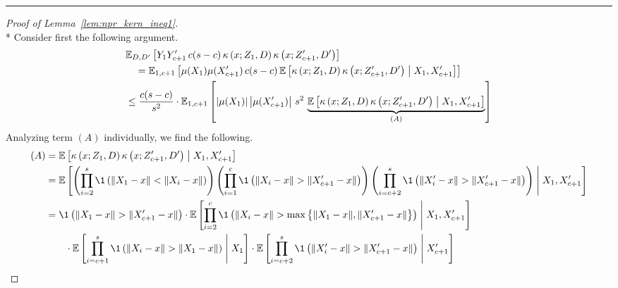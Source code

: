 \hrule

\begin{proof}[Proof of Lemma~\ref{lem:npr_kern_ineq1}]\mbox{}\\*
	Consider first the following argument.
	\begin{equation}
		\begin{aligned}
			 & \mathbb{E}_{D, D^{\prime}}\left[Y_{1}Y_{c+1}^{\prime} \, c(s-c) \, \kappa\left(x; Z_{1}, D\right)\kappa\left(x; Z_{c+1}^{\prime}, D^{\prime}\right)\right]          \\
			 & \quad = \mathbb{E}_{1, c+1}\left[\mu(X_1) \mu(X_{c+1}^{\prime}) \, c(s-c) \,
			\mathbb{E}\left[\kappa\left(x; Z_{1}, D\right)\kappa\left(x; Z_{c+1}^{\prime}, D^{\prime}\right) \; \middle| \; X_1, X_{c+1}^{\prime}\right]\right]                    \\
			 & \leq \frac{c(s-c)}{s^2} \cdot \mathbb{E}_{1, c+1}\left[\left|\mu(X_1)\right| \left|\mu(X_{c+1}^{\prime})\right| \, s^2 \,
			\underbrace{\mathbb{E}\left[\kappa\left(x; Z_{1}, D\right)\kappa\left(x; Z_{c+1}^{\prime}, D^{\prime}\right) \; \middle| \; X_1, X_{c+1}^{\prime}\right]}_{(A)}\right] \\
		\end{aligned}
	\end{equation}
	Analyzing term $(A)$ individually, we find the following.
	\begin{equation}
		\begin{aligned}
			(A)
			 & = \E\left[\kappa\left(x; Z_{1}, D\right)\kappa\left(x; Z_{c+1}^{\prime}, D^{\prime}\right) \; \middle| \; X_1, X_{c+1}^{\prime}\right]                                                                                       \\
			 & = \E\left[\left(\prod_{i = 2}^{s}\1\left(\|X_1 - x\| < \|X_{i} - x\|\right)\right)
				\left(\prod_{i = 1}^{c}\1\left(\|X_i - x\| > \|X_{c+1}^{\prime} - x\|\right)\right)
			\left(\prod_{i = c+2}^{s}\1\left(\|X_i^{\prime} - x\| > \|X_{c+1}^{\prime} - x\|\right)\right) \; \middle| \; X_1, X_{c+1}^{\prime}\right]                                                                                      \\
			 & = \1\left(\|X_1 - x\| > \|X_{c+1}^{\prime} - x\|\right) \cdot \E\left[\prod_{i = 2}^{c}\1\left(\|X_{i} - x\| > \max\left\{\|X_{1} - x\|, \|X_{c+1}^{\prime} - x\|\right\}\right) \; \middle| \; X_1, X_{c+1}^{\prime}\right] \\
			 & \quad \quad  \cdot \E\left[\prod_{i = c+1}^{s}\1\left(\|X_i - x\| > \|X_{1} - x\|\right) \; \middle| \; X_{1}\right]
			\cdot \E\left[\prod_{i = c+2}^{s}\1\left(\|X_i^{\prime} - x\| > \|X_{c+1}^{\prime} - x\|\right) \; \middle| \; X_{c+1}^{\prime}\right]                                                                                          \\

\end{aligned}
\end{equation}
\end{proof}

